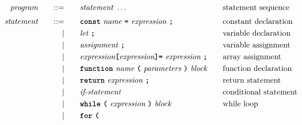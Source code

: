 \begin{alignat*}{9}
&& \textit{program}    &&\quad ::= &\quad && \textit{statement} \ \ldots
                                                           && \textrm{statement sequence} \\[1mm]
&& \textit{statement}    &&\quad ::= &\quad && \textbf{\texttt{const}}\  \textit{name} \ 
                                           \textbf{\texttt{=}}\  \textit{expression} \ \textbf{\texttt{;}}
                                                           && \textrm{constant declaration} \\
&&                       && |   &\quad && \textit{let} \ \textbf{\texttt{;}}
                                                           && \textrm{variable declaration} \\
&&                       && |   &\quad && \textit{assignment} \ \textbf{\texttt{;}}
                                                           && \textrm{variable assignment} \\
&&                       && |   &\quad && \textit{expression} \textbf{\texttt{[}}
                                          \textit{expression} \textbf{\texttt{]}}
                                           \textbf{\texttt{=}}\  \textit{expression} \ \textbf{\texttt{;}}
                                                           && \textrm{array assignment} \\
&&                       && |   &\quad && \textbf{\texttt{function}}\  \textit{name} \ 
                                   \textbf{\texttt{(}}\  \textit{parameters} \ \textbf{\texttt{)}}\ \textit{block} \quad
                                                           && \textrm{function declaration}\\
&&                       && |   &\quad && \textbf{\texttt{return}}\  \textit{expression} \ \textbf{\texttt{;}}
                                                           && \textrm{return statement}\\
&&                       && |   &\quad && \textit{if-statement} \quad
                                                           && \textrm{conditional statement}\\
&&                       && |   &\quad && \textbf{\texttt{while}}\  
                                   \textbf{\texttt{(}}\  \textit{expression} \ \textbf{\texttt{)}} \
                                   \textit{block}
                                                           && \textrm{while loop}\\
&&                       && |   &\quad && \textbf{\texttt{for}}\ \textbf{\texttt{(}} \ 

\end{alignat*}
